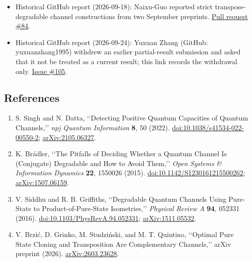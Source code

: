\begin{itemize}
  \item Historical GitHub report (2026-09-18): Naixu-Guo reported strict transpose-degradable channel constructions from two September preprints. \href{https://github.com/Naixu-Guo/quantum-open-problems/pull/84}{Pull request \#84}.

  \item Historical GitHub report (2026-09-24): Yuxuan Zhang (GitHub: yuxuanzhang1995) withdrew an earlier partial-result submission and asked that it not be treated as a current result; this link records the withdrawal only. \href{https://github.com/Naixu-Guo/quantum-open-problems/issues/105}{Issue \#105}.
\end{itemize}

\subsection*{References}

\begin{enumerate}[label={},leftmargin=4.8em,labelsep=0.5em]
  \footnotesize
  \item[\textup{[SD22]}]\label{ref:p53-singh-datta}
  S. Singh and N. Datta,
  \lq\lq Detecting Positive Quantum Capacities of Quantum Channels,\rq\rq{}
  \emph{npj Quantum Information} \textbf{8}, 50 (2022).
  \href{https://doi.org/10.1038/s41534-022-00550-2}{doi:10.1038/s41534-022-00550-2};
  \href{https://arxiv.org/abs/2105.06327}{arXiv:2105.06327}.

  \item[\textup{[Bra15]}]\label{ref:p53-bradler}
  K. Br{\'a}dler,
  \lq\lq The Pitfalls of Deciding Whether a Quantum Channel Is (Conjugate)
  Degradable and How to Avoid Them,\rq\rq{}
  \emph{Open Systems \& Information Dynamics} \textbf{22}, 1550026 (2015).
  \href{https://doi.org/10.1142/S1230161215500262}{doi:10.1142/S1230161215500262};
  \href{https://arxiv.org/abs/1507.06159}{arXiv:1507.06159}.

  \item[\textup{[SG16]}]\label{ref:p53-siddhu-griffiths}
  V. Siddhu and R. B. Griffiths,
  \lq\lq Degradable Quantum Channels Using Pure-State to Product-of-Pure-State
  Isometries,\rq\rq{} \emph{Physical Review A} \textbf{94}, 052331 (2016).
  \href{https://doi.org/10.1103/PhysRevA.94.052331}{doi:10.1103/PhysRevA.94.052331};
  \href{https://arxiv.org/abs/1511.05532}{arXiv:1511.05532}.

  \item[\textup{[BGS+26]}]\label{ref:p53-brzic-et-al}
  V. Brzi{\'c}, D. Grinko, M. Studzi{\'n}ski, and M. T. Quintino,
  \lq\lq Optimal Pure State Cloning and Transposition Are Complementary
  Channels,\rq\rq{} arXiv preprint (2026).
  \href{https://arxiv.org/abs/2603.23628}{arXiv:2603.23628}.
\end{enumerate}

